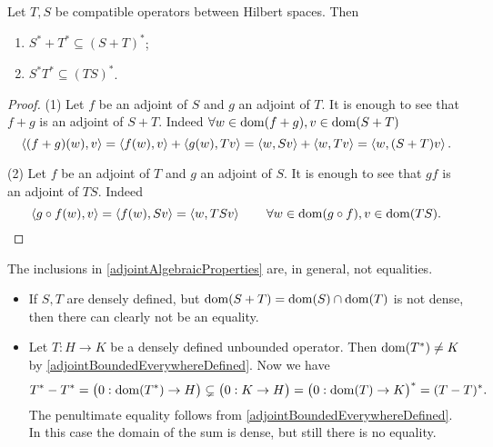 \begin{proposition} \label{adjointAlgebraicProperties}
Let $T,S$ be compatible operators between Hilbert spaces. Then
\begin{enumerate}
\item $S^* + T^* \subseteq (S+T)^*$;
\item $S^*T^* \subseteq (TS)^*$.
\end{enumerate}
\end{proposition}
\begin{proof}
(1) Let $f$ be an adjoint of $S$ and $g$ an adjoint of $T$. It is enough to see that $f+g$ is an adjoint of $S+T$. Indeed $\forall w\in \operatorname{dom}(f + g), v\in \operatorname{dom}(S+T)$
\[ \left\langle (f + g)(w), v \right\rangle = \left\langle f(w),v \right\rangle + \left\langle g(w), Tv \right\rangle = \left\langle w,Sv \right\rangle + \left\langle w,Tv \right\rangle = \left\langle w,(S+T)v \right\rangle. \]

(2) Let $f$ be an adjoint of $T$ and $g$ an adjoint of $S$. It is enough to see that $gf$ is an adjoint of $TS$. Indeed
\[ \left\langle g\circ f(w), v \right\rangle = \left\langle f(w), Sv \right\rangle = \left\langle w,TSv \right\rangle \qquad \forall w\in \operatorname{dom}(g\circ f), v\in \operatorname{dom}(TS). \]
\end{proof}

\begin{example}
The inclusions in \ref{adjointAlgebraicProperties} are, in general, not equalities.
\begin{itemize}
\item If $S,T$ are densely defined, but $\operatorname{dom}(S+T) = \operatorname{dom}(S)\cap \operatorname{dom}(T)$ is not dense, then there can clearly not be an equality.
\item Let $T: H\to K$ be a densely defined unbounded operator. Then $\operatorname{dom}(T^*) \neq K$ by \ref{adjointBoundedEverywhereDefined}. Now we have
\[ T^* - T^* = \big(0: \operatorname{dom}(T^*) \to H\big) \subsetneq \big(0: K\to H\big) = \big(0: \operatorname{dom}(T) \to K\big)^* = (T-T)^*. \]
The penultimate equality follows from \ref{adjointBoundedEverywhereDefined}. In this case the domain of the sum is dense, but still there is no equality.
\end{itemize}
\end{example}


